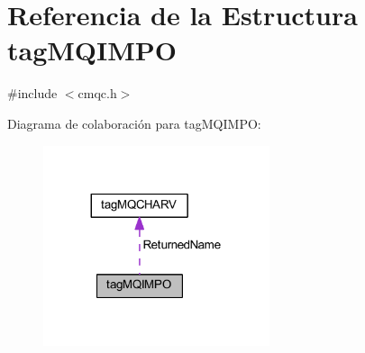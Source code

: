\hypertarget{structtag_m_q_i_m_p_o}{}\section{Referencia de la Estructura tag\+M\+Q\+I\+M\+P\+O}
\label{structtag_m_q_i_m_p_o}


{\ttfamily \#include $<$cmqc.\+h$>$}



Diagrama de colaboración para tag\+M\+Q\+I\+M\+P\+O\+:\nopagebreak
\begin{figure}[H]
\begin{center}
\leavevmode
\includegraphics[width=188pt]{structtag_m_q_i_m_p_o__coll__graph}
\end{center}
\end{figure}
